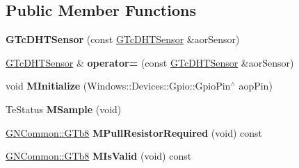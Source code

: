 \subsection*{Public Member Functions}
\begin{DoxyCompactItemize}
\item 
\mbox{\label{class_g_n_common_1_1_g_n_drivers_1_1_g_tc_d_h_t_sensor_a28a32f003a0916d1009564d0dedf75de}} 
{\bfseries G\+Tc\+D\+H\+T\+Sensor} (const \mbox{\hyperlink{class_g_n_common_1_1_g_n_drivers_1_1_g_tc_d_h_t_sensor}{G\+Tc\+D\+H\+T\+Sensor}} \&aor\+Sensor)
\item 
\mbox{\label{class_g_n_common_1_1_g_n_drivers_1_1_g_tc_d_h_t_sensor_a42e5b9edaea5dcfc2c914a25ba41b1ef}} 
\mbox{\hyperlink{class_g_n_common_1_1_g_n_drivers_1_1_g_tc_d_h_t_sensor}{G\+Tc\+D\+H\+T\+Sensor}} \& {\bfseries operator=} (const \mbox{\hyperlink{class_g_n_common_1_1_g_n_drivers_1_1_g_tc_d_h_t_sensor}{G\+Tc\+D\+H\+T\+Sensor}} \&aor\+Sensor)
\item 
\mbox{\label{class_g_n_common_1_1_g_n_drivers_1_1_g_tc_d_h_t_sensor_a66a5d9d2f43f1a42dce542181d98acb5}} 
void {\bfseries M\+Initialize} (Windows\+::\+Devices\+::\+Gpio\+::\+Gpio\+Pin$^\wedge$ aop\+Pin)
\item 
\mbox{\label{class_g_n_common_1_1_g_n_drivers_1_1_g_tc_d_h_t_sensor_af433fb954e3f8c8b5ed2c794d1be2563}} 
Te\+Status {\bfseries M\+Sample} (void)
\item 
\mbox{\label{class_g_n_common_1_1_g_n_drivers_1_1_g_tc_d_h_t_sensor_a6a29ed7188a817c4e35a8d87ee34d65c}} 
\mbox{\hyperlink{namespace_g_n_common_a6b5283329f609e2175dd0c91fc1520ba}{G\+N\+Common\+::\+G\+Tb8}} {\bfseries M\+Pull\+Resistor\+Required} (void) const
\item 
\mbox{\label{class_g_n_common_1_1_g_n_drivers_1_1_g_tc_d_h_t_sensor_aedc75ca476023f30adfc10cf27e431cd}} 
\mbox{\hyperlink{namespace_g_n_common_a6b5283329f609e2175dd0c91fc1520ba}{G\+N\+Common\+::\+G\+Tb8}} {\bfseries M\+Is\+Valid} (void) const

\end{DoxyCompactItemize}
